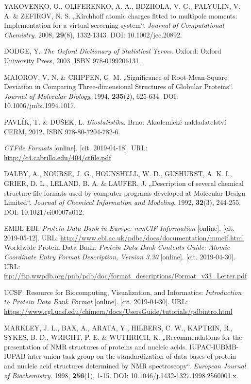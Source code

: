 \begin{thebibliography}{10}
YAKOVENKO, O., OLIFERENKO, A. A., BDZHOLA, V. G., PALYULIN, V. A. \& ZEFIROV, N. S. „Kirchhoff atomic charges fitted to multipole moments: Implementation for a virtual screening system“. \textit{Journal of Computational Chemistry}. 2008, \textbf{29}(8), 1332-1343. DOI: 10.1002/jcc.20892.

DODGE, Y. \textit{The Oxford Dictionary of Statistical Terms}. Oxford: Oxford University Press, 2003. ISBN 978-0199206131.

MAIOROV, V. N. \& CRIPPEN, G. M. „Significance of Root-Mean-Square Deviation in Comparing Three-dimensional Structures of Globular Proteins“. \textit{Journal of Molecular Biology}. 1994, \textbf{235}(2), 625-634. DOI: 10.1006/jmbi.1994.1017. 

PAVLÍK, T. \& DUŠEK, L. \textit{Biostatistika}. Brno: Akademické nakladatelství CERM, 2012. ISBN 978-80-7204-782-6.

\textit{CTFile Formats} [online]. [cit. 2019-04-18]. URL: \url{http://c4.cabrillo.edu/404/ctfile.pdf}

DALBY, A., NOURSE, J. G., HOUNSHELL, W. D., GUSHURST, A. K. I., GRIER, D. L., LELAND, B. A. \& LAUFER, J. „Description of several chemical structure file formats used by computer programs developed at Molecular Design Limited“. \textit{Journal of Chemical Information and Modeling}. 1992, \textbf{32}(3), 244-255. DOI: 10.1021/ci00007a012.

EMBL-EBI: \textit{Protein Data Bank in Europe: mmCIF Information} [online]. [cit. 2019-05-12]. URL: \url{http://www.ebi.ac.uk/pdbe/docs/documentation/mmcif.html}
Worldwide Protein Data Bank: \textit{Protein Data Bank Contents Guide: Atomic Coordinate Entry Format Description, Version 3.30} [online]. [cit. 2019-04-30]. URL: \url{ftp://ftp.wwpdb.org/pub/pdb/doc/format_descriptions/Format_v33_Letter.pdf}

UCSF: Resource for Biocomputing, Visualization, and Informatics: \textit{Introduction to Protein Data Bank Format} [online]. [cit. 2019-04-30]. URL: \url{https://www.cgl.ucsf.edu/chimera/docs/UsersGuide/tutorials/pdbintro.html}

MARKLEY, J. L., BAX, A., ARATA, Y., HILBERS, C. W., KAPTEIN, R., SYKES, B. D., WRIGHT, P. E. \& WUTHRICH, K. „Recommendations for the presentation of NMR structures of proteins and nucleic acids. IUPAC-IUBMB-IUPAB inter-union task group on the standardization of data bases of protein and nucleic acid structures determined by NMR spectroscopy“. \textit{European Journal of Biochemistry}. 1998, \textbf{256}(1), 1-15. DOI: 10.1046/j.1432-1327.1998.2560001.x.


\end{thebibliography}

